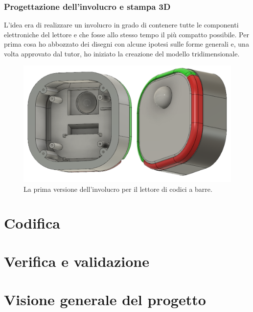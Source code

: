 \subsubsection{Progettazione dell'involucro e stampa 3D}
L'idea era di realizzare un involucro in grado di contenere tutte le componenti elettroniche del lettore e che fosse allo stesso tempo il più compatto possibile.
Per prima cosa ho abbozzato dei disegni con alcune ipotesi sulle forme generali e, una volta approvato dal tutor, ho iniziato la creazione del modello tridimensionale.

\begin{figure}[H]
	\begin{center}
	\includegraphics[scale=0.37]{immagini/render.png}
	\caption{La prima versione dell'involucro per il lettore di codici a barre.}
	\end{center}
\end{figure}



\section{Codifica}

\section{Verifica e validazione}

\section{Visione generale del progetto}